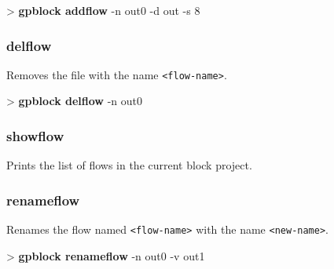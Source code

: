 \documentclass[10pt,a4paper]{article}
\begin{document}
\begin{sampletitle}
> \textbf{gpblock addflow} -n out0 -d out -s 8
\end{sampletitle}


\subsubsection{delflow}
\label{subsec:delflow}

Removes the file with the name \texttt{<flow-name>}.\\


\begin{sampletitle}
> \textbf{gpblock delflow} -n out0
\end{sampletitle}


\subsubsection{showflow}
\label{subsec:showflow}

Prints the list of flows in the current block project.

\subsubsection{renameflow}
\label{subsec:renameflow}

Renames the flow named \texttt{<flow-name>} with the name \texttt{<new-name>}.\\


\begin{sampletitle}
> \textbf{gpblock renameflow} -n out0 -v out1
\end{sampletitle}
\end{document}
